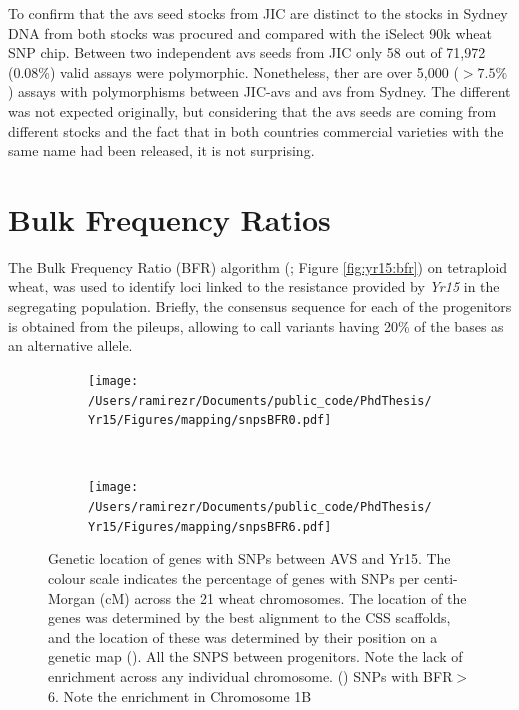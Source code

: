 To confirm that the \acrlong{avs} seed stocks from JIC are distinct to the stocks in Sydney  DNA from both stocks was procured and compared with the iSelect 90k wheat SNP chip. 
Between two independent \acrlong{avs} seeds from JIC only 58 out of 71,972 (0.08\%) valid assays were polymorphic. 
Nonetheless, ther are over 5,000 ($>7.5\%$) assays with polymorphisms between  JIC-\acrlong{avs} and \acrlong{avs} from Sydney. 
The different was not expected originally, but considering that the \acrlong{avs} seeds are coming from different stocks and the fact that in both countries commercial varieties with the same name had been released, it is not surprising. 


\section{Bulk Frequency Ratios}

The Bulk Frequency Ratio (BFR) algorithm (\citealt{Trick2012}; Figure \ref{fig:yr15:bfr}) on tetraploid wheat, was used to identify loci linked to the resistance provided by \textit{Yr15} in the segregating population.
Briefly, the consensus sequence for each of the progenitors is obtained from the pileups, allowing to call variants having 20\% of the bases as an alternative allele. 

\begin{figure}
	\centering
	\begin{subfigure}{0.4\textwidth}
	\caption{}
	\label{fig:yr15:bfr0}
	\texttt{[image: /Users/ramirezr/Documents/public\_code/PhdThesis/Yr15/Figures/mapping/snpsBFR0.pdf]}
	\end{subfigure}
	~
	\begin{subfigure}{0.45\textwidth}
	\caption{}
	\label{fig:yr15:bfr6}
	\texttt{[image: /Users/ramirezr/Documents/public\_code/PhdThesis/Yr15/Figures/mapping/snpsBFR6.pdf]}
	\end{subfigure}
	\caption{Genetic location of genes with SNPs between AVS and Yr15. The colour scale indicates the percentage of genes with SNPs per centi-Morgan (cM) across the 21 wheat chromosomes. The location of the genes was determined by the best alignment to the CSS scaffolds, and the location of these was determined by their position on a genetic map \citep{Wang2014} (). All the SNPS between progenitors. Note the lack of enrichment across any individual chromosome. () SNPs with BFR$>$6. Note the enrichment in Chromosome 1B }
	\label{fig:yr15:bfrs:0-6}
\end{figure}

